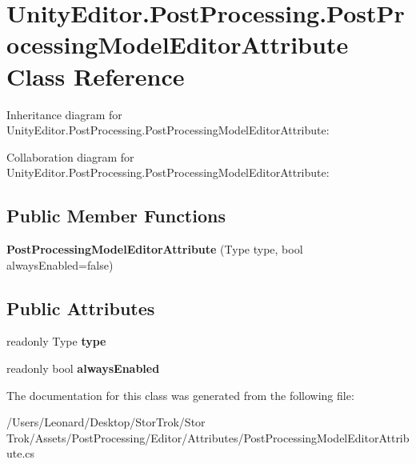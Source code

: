 \hypertarget{class_unity_editor_1_1_post_processing_1_1_post_processing_model_editor_attribute}{}\section{Unity\+Editor.\+Post\+Processing.\+Post\+Processing\+Model\+Editor\+Attribute Class Reference}
\label{class_unity_editor_1_1_post_processing_1_1_post_processing_model_editor_attribute}


Inheritance diagram for Unity\+Editor.\+Post\+Processing.\+Post\+Processing\+Model\+Editor\+Attribute\+:


Collaboration diagram for Unity\+Editor.\+Post\+Processing.\+Post\+Processing\+Model\+Editor\+Attribute\+:
\subsection*{Public Member Functions}
\begin{DoxyCompactItemize}
\item 
\mbox{\label{class_unity_editor_1_1_post_processing_1_1_post_processing_model_editor_attribute_a16868845236576459a018d59a09b3e4a}} 
{\bfseries Post\+Processing\+Model\+Editor\+Attribute} (Type type, bool always\+Enabled=false)
\end{DoxyCompactItemize}
\subsection*{Public Attributes}
\begin{DoxyCompactItemize}
\item 
\mbox{\label{class_unity_editor_1_1_post_processing_1_1_post_processing_model_editor_attribute_aa09b0eb015705ec04ab6161174fbe227}} 
readonly Type {\bfseries type}
\item 
\mbox{\label{class_unity_editor_1_1_post_processing_1_1_post_processing_model_editor_attribute_a3f037dfd948be211f3d86c91dc28cdfe}} 
readonly bool {\bfseries always\+Enabled}
\end{DoxyCompactItemize}


The documentation for this class was generated from the following file\+:\begin{DoxyCompactItemize}
\item 
/\+Users/\+Leonard/\+Desktop/\+Stor\+Trok/\+Stor Trok/\+Assets/\+Post\+Processing/\+Editor/\+Attributes/Post\+Processing\+Model\+Editor\+Attribute.\+cs\end{DoxyCompactItemize}
